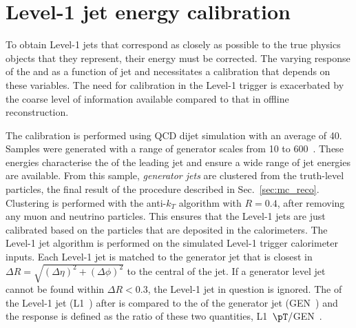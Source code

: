 \section{Level-1 jet energy calibration}
\label{sec:l1jec}

To obtain Level-1 jets that correspond as closely as possible to the
true physics objects that they represent, their energy must be
corrected. The
varying response of the \HCAL and \ECAL as a function of jet \pT and
\eta necessitates a calibration that depends on these variables.  The
need for calibration in the Level-1 trigger is exacerbated by the
coarse level of information available compared to that in offline
reconstruction.

The calibration is performed using QCD dijet \MC simulation with an
average \PU of 40. Samples were generated with a range of generator
scales from 10 to 600~\gev. These energies characterise the \pT of the
leading jet and ensure a wide range of jet energies are available.
From this sample, \emph{generator jets} are clustered from
the truth-level particles, the final result of the procedure
described in Sec.~\ref{sec:mc_reco}. Clustering is performed with the
anti-$k_T$ algorithm with $R=0.4$, after removing any muon and
neutrino particles. This ensures that the Level-1 jets are just
calibrated based on the particles that are deposited in the
calorimeters. The Level-1 jet algorithm is performed on the simulated
Level-1
trigger calorimeter inputs. Each Level-1 jet is matched to the
generator jet that is closest in $\Delta
R=\sqrt{(\Delta\eta)^2+(\Delta\phi)^2}$ to the central \TT of the jet.
If a generator level jet cannot be found within $\Delta R<0.3$, the
Level-1 jet in question is ignored. The \pT of the Level-1 jet
(L1~\pT) after \PUS is compared to the \pT of the generator jet
(GEN~\pT) and the response is defined as the ratio of these two
quantities, L1~$\pT/$GEN~\pT.

